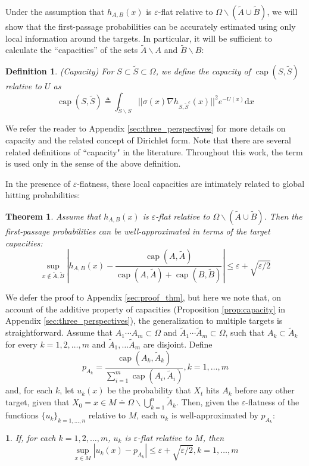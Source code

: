 \documentclass[nofootinbib,english, aip, jcp, priprint, graphicx,floatfix]{revtex4-1}
\newtheorem{definition}{Definition}
\newtheorem{theorem}{Theorem}
\theoremstyle{plain}
\theoremstyle{definition}
\theoremstyle{plain}
\newtheorem{cor}[thm]{\protect\corollaryname}
\newcommand{\capac}[2]{\ensuremath{\operatorname{cap}}(#1,#2)}
\providecommand{\corollaryname}{Corollary}
\newcommand{\tA}{{\tilde A}}
\newcommand{\tB}{{\tilde B}}
\begin{document}
Under the assumption that $h_{A,B}(x)$ is $\varepsilon$-flat
relative to $\Omega \backslash (\tilde A \cup \tilde B)$, 
we will show that the first-passage probabilities can be accurately estimated using only local information around the targets. In particular, it will be sufficient to calculate the ``capacities'' of 
the sets $\tA \backslash A$ and $\tB \backslash B$:

\begin{definition}(Capacity)
For $S \subset \tilde{S} \subset \Omega$, we define the capacity of $\ensuremath{\operatorname{cap}} (S, \tilde{S})$ relative to $U$ as
%
\[ \ensuremath{\operatorname{cap}} (S, \tilde{S}) \triangleq \int_{\tilde S \backslash S}
||\sigma(x) \nabla h_{S, \tilde{S}^c}(x)||^2 e^{- U(x)} \mathrm{d} x \]
%  
\end{definition}

We refer the reader to Appendix \ref{sec:three_perspectives} for more details on capacity and the related concept of Dirichlet form.  Note that there are several related definitions of ``capacity" in the literature.  Throughout this work, the term is used only in the sense of the above definition. 

In the presence of $\varepsilon$-flatness, these local capacities are intimately related to global hitting probabilities:

\begin{theorem}\label{thm:main_thm}  
Assume that  $h_{A,B}(x)$ is $\varepsilon$-flat relative to 
$\Omega \backslash (\tilde A \cup \tilde B)$.
Then the first-passage probabilities can be well-approximated in terms of the target capacities:
\[ \sup_{x \notin \tilde A,\tilde B} \left| h_{A,B} (x) - \frac{\capac{A}{\tilde A}}{\capac{A}{\tilde A}+\capac{B}{\tilde B}} \right| \leqslant \varepsilon + \sqrt{\varepsilon/2} \]
\end{theorem}

We defer the proof to Appendix \ref{sec:proof_thm}, but here we note that, on account of the additive property of 
capacities (Proposition \ref{prop:capacity} in Appendix \ref{sec:three_perspectives}), the generalization to multiple targets is straightforward.
Assume that $A_1\cdots A_m \subset \Omega$ and $\tilde A_1\cdots \tilde A_m \subset \Omega$, such that $A_k \subset \tilde A_k$ for every $k=1,2,\ldots,m$ and $\tA_1,\ldots\tA_m$ are disjoint. Define 
\begin{equation*}
p_{A_k} = \frac{\ensuremath{\operatorname{cap}} (A_k, \tilde{A}_k)}{\sum_{i = 1}^m \ensuremath{\operatorname{cap}} (A_i, \tilde{A}_i)}, k=1,\dots, m
\end{equation*} 
and, for each $k$, let $u_k(x)$ be the probability that $X_t$ hits $A_k$ before any other target, given that 
$X_0=x\in M\doteq \Omega\backslash\bigcup_{k = 1}^n \tilde{A}_k $.
Then, given the $\varepsilon$-flatness of the functions $\{u_k\}_{k=1,\dots, n}$ relative to $M$, each $u_k$ is well-approximated by $p_{A_k}$:
\begin{cor}\label{thm:main_cor} 
If, for each $k=1,2,\ldots,m$, $u_k$ is 
$\varepsilon$-flat relative to $M$, then
\[ \sup_{x \in M} \left| u_k (x) - p_{A_k} \right| \leqslant \varepsilon + \sqrt{\varepsilon/2}, k=1,\dots, m\]
\end{cor}
\end{document}
